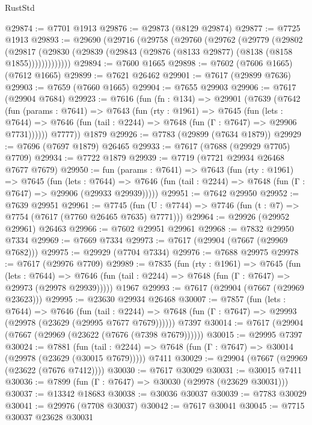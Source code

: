 \begin{lexlean}{RustStd}
\begin{coremodule}
@29874 := @7701 @1913
@29876 := @29873 (@8129 @29874)
@29877 := @7725 @1913
@29893 := @29690
    (@29716
      (@29758
        (@29760
          (@29762
            (@29779
              (@29802
                (@29817
                  (@29830 (@29839 (@29843 (@29876 (@8133 @29877) (@8138 (@8158 @1855)))))))))))))
@29894 := @7600 @1665
@29898 := @7602 (@7606 @1665) (@7612 @1665)
@29899 := @7621 @26462
@29901 := @7617 (@29899 @7636)
@29903 := @7659 (@7660 @1665)
@29904 := @7655 @29903
@29906 := @7617 (@29904 @7684)
@29923 := @7616
    (fun (fn : @134) =>
    @29901
      (@7639
        (@7642
          (fun (params : @7641) =>
          @7643
            (fun (rty : @1961) =>
            @7645
              (fun (lets : @7644) =>
              @7646 (fun (tail : @2244) => @7648 (fun (Γ : @7647) => @29906 @7731))))))
        @7777))
    @1879
@29926 := @7783 (@29899 (@7634 @1879))
@29929 := @7696 (@7697 @1879) @26465
@29933 := @7617 (@7688 (@29929 @7705) @7709)
@29934 := @7722 @1879
@29939 := @7719 (@7721 @29934 @26468 @7677 @7679)
@29950 := fun (params : @7641) =>
  @7643
    (fun (rty : @1961) =>
    @7645
      (fun (lets : @7644) =>
      @7646 (fun (tail : @2244) => @7648 (fun (Γ : @7647) => @29906 (@29933 @29939)))))
@29951 := @7642 @29950
@29952 := @7639 @29951
@29961 := @7745
    (fun (U : @7744) => @7746 (fun (t : @7) => @7754 (@7617 (@7760 @26465 @7635) @7771)))
@29964 := @29926 (@29952 @29961) @26463
@29966 := @7602 @29951 @29961
@29968 := @7832 @29950 @7334
@29969 := @7669 @7334
@29973 := @7617 (@29904 (@7667 (@29969 @7682)))
@29975 := @29929 (@7704 @7334)
@29976 := @7688 @29975
@29978 := @7617 (@29976 @7709)
@29989 := @7835
    (fun (rty : @1961) =>
    @7645
      (fun (lets : @7644) =>
      @7646 (fun (tail : @2244) => @7648 (fun (Γ : @7647) => @29973 (@29978 @29939)))))
    @1967
@29993 := @7617 (@29904 (@7667 (@29969 @23623)))
@29995 := @23630 @29934 @26468
@30007 := @7857
    (fun (lets : @7644) =>
    @7646
      (fun (tail : @2244) =>
      @7648 (fun (Γ : @7647) => @29993 (@29978 (@23629 (@29995 @7677 @7679))))))
    @7397
@30014 := @7617 (@29904 (@7667 (@29969 (@23622 (@7676 (@7398 @7679))))))
@30015 := @29995 @7397
@30024 := @7881
    (fun (tail : @2244) => @7648 (fun (Γ : @7647) => @30014 (@29978 (@23629 (@30015 @7679)))))
    @7411
@30029 := @29904 (@7667 (@29969 (@23622 (@7676 @7412))))
@30030 := @7617 @30029
@30031 := @30015 @7411
@30036 := @7899 (fun (Γ : @7647) => @30030 (@29978 (@23629 @30031)))
@30037 := @13342 @18683
@30038 := @30036 @30037
@30039 := @7783 @30029
@30041 := @29976 (@7708 @30037)
@30042 := @7617 @30041
@30045 := @7715 @30037 @23628 @30031

\end{coremodule}
\end{lexlean}
